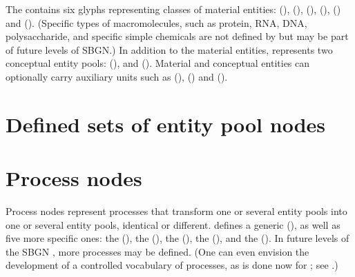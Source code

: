 The \PD contains six glyphs representing classes of material entities:  (),  (),  (),  (),  () and  ().
(Specific types of macromolecules, such as protein, RNA, DNA, polysaccharide, and specific simple chemicals are not defined by \PD but may be part of future levels of SBGN.)
In addition to the material entities, \PD represents two conceptual entity pools:  (), and  ().
Material and conceptual entities can optionally carry auxiliary units such as  (),   () and  ().











\section{Defined sets of entity pool nodes}



\section{Process nodes}\label{sec:PNs}

Process nodes represent processes that transform one or several entity pools into one or several entity pools, identical or different.  \SBGNPDLone defines a generic  (), as well as five more specific ones: the  (), the  (), the  (), the  (), and the  ().  In future levels of the SBGN \PDl, more processes may be defined.  (One can even envision the development of a controlled vocabulary of processes, as is done now for ; see .)








